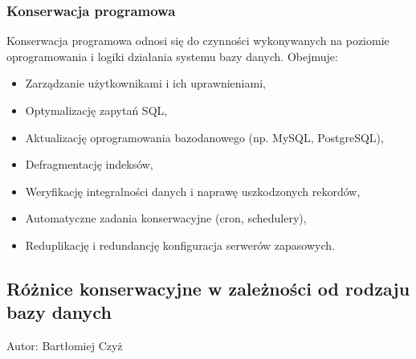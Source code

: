 \documentclass[letterpaper,10pt,polish]{sphinxmanual}
\begin{document}
\subsubsection{Konserwacja programowa}
\label{\detokenize{rozdzial2/Kontrola_i_konserwacja/kontrola_i_konserwacja:konserwacja-programowa}}
\sphinxAtStartPar
Konserwacja programowa odnosi się do czynności wykonywanych na poziomie oprogramowania i logiki działania systemu bazy danych. Obejmuje:
\begin{itemize}
\item {} 
\sphinxAtStartPar
Zarządzanie użytkownikami i ich uprawnieniami,

\item {} 
\sphinxAtStartPar
Optymalizację zapytań SQL,

\item {} 
\sphinxAtStartPar
Aktualizację oprogramowania bazodanowego (np. MySQL, PostgreSQL),

\item {} 
\sphinxAtStartPar
Defragmentację indeksów,

\item {} 
\sphinxAtStartPar
Weryfikację integralności danych i naprawę uszkodzonych rekordów,

\item {} 
\sphinxAtStartPar
Automatyczne zadania konserwacyjne (cron, schedulery),

\item {} 
\sphinxAtStartPar
Reduplikację i redundancję \sphinxhyphen{} konfiguracja serwerów zapasowych.

\end{itemize}


\subsection{Różnice konserwacyjne w zależności od rodzaju bazy danych}
\label{\detokenize{rozdzial2/Kontrola_i_konserwacja/kontrola_i_konserwacja:roznice-konserwacyjne-w-zaleznosci-od-rodzaju-bazy-danych}}
\sphinxAtStartPar
Autor: Bartłomiej Czyż
\end{document}
